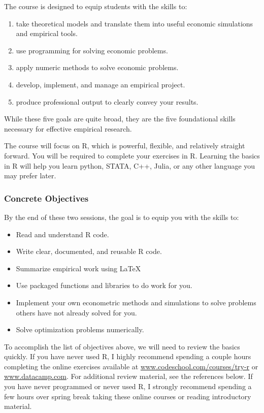 \documentclass{scrartcl}
\begin{document}
\pagebreak

The course is designed to equip students with the skills to:
\begin{enumerate}
\item take theoretical models and translate them into useful economic simulations and empirical tools.
\item use programming for solving economic problems.
\item apply numeric methods to solve economic problems.
\item develop, implement, and manage an empirical project.
\item produce professional output to clearly convey your results.
\end{enumerate}
While these five goals are quite broad, they are the five foundational skills necessary for effective empirical research. 

The course will focus on R, which is powerful, flexible, and relatively straight forward. You will be required to complete your exercises in R. Learning the basics in R will help you learn python, STATA, C++, Julia, or any other language you may prefer later.

\subsubsection*{Concrete Objectives}



By the end of these two sessions, the goal is to equip you with the skills to:
\begin{itemize}
\item Read and understand R code.
\item Write clear, documented, and reusable R code.
\item Summarize empirical work using \LaTeX
\item Use packaged functions and libraries to do work for you.
\item Implement your own econometric methods and simulations to solve problems others have not already solved for you.
\item Solve optimization problems numerically. 
\end{itemize}

To accomplish the list of objectives above, we will need to review the basics quickly. If you have never used R, I highly recommend spending a couple hours completing the online exercises available at \href{www.codeschool.com/courses/try-r}{www.codeschool.com/courses/try-r} or  \href{www.datacamp.com}{www.datacamp.com}. For additional review material, see the references below. If you have never programmed or never used R, I strongly recommend spending a few hours over spring break taking these online courses or reading introductory material. 
\end{document}
